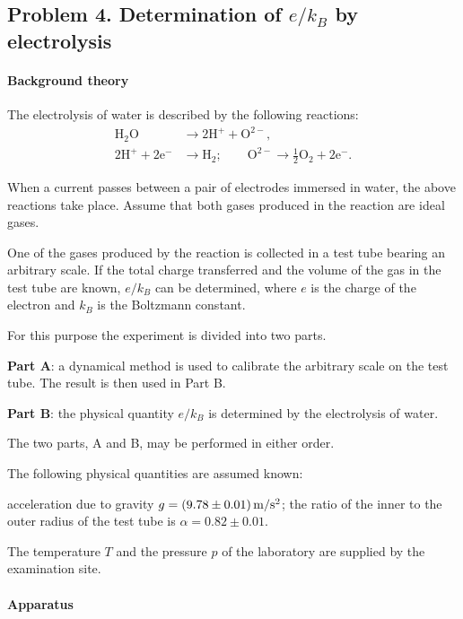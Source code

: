 \subsection*{Problem 4. Determination of $e/k_B$ by electrolysis}

\paragraph{Background theory}

The electrolysis of water is described by the following reactions:
\begin{align*}
\mathrm{H_2O} &\longrightarrow 2\mathrm{H^+} + \mathrm{O^{2-}},\\
2\mathrm{H^+} + 2\mathrm{e^-} &\longrightarrow \mathrm{H_2};\qquad
\mathrm{O^{2-}} \longrightarrow \tfrac{1}{2}\mathrm{O_2} + 2\mathrm{e^-}.
\end{align*}

When a current passes between a pair of electrodes immersed in water, the above reactions take place. Assume that both gases produced in the reaction are ideal gases.

One of the gases produced by the reaction is collected in a test tube bearing an arbitrary scale. If the total charge transferred and the volume of the gas in the test tube are known, $e/k_B$ can be determined, where $e$ is the charge of the electron and $k_B$ is the Boltzmann constant.

For this purpose the experiment is divided into two parts.

\textbf{Part A}: a dynamical method is used to calibrate the arbitrary scale on the test tube. The result is then used in Part B.

\textbf{Part B}: the physical quantity $e/k_B$ is determined by the electrolysis of water.

The two parts, A and B, may be performed in either order.

The following physical quantities are assumed known:

acceleration due to gravity $g = (9.78 \pm 0.01)\,\mathrm{m/s^2}$; the ratio of the inner to the outer radius of the test tube is $\alpha = 0.82 \pm 0.01$.

The temperature $T$ and the pressure $p$ of the laboratory are supplied by the examination site.

\paragraph{Apparatus}

